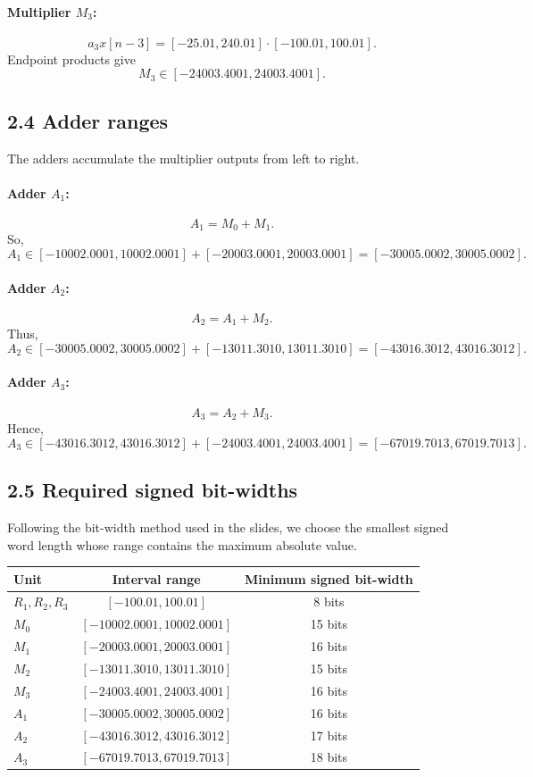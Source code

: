 \documentclass[11pt,a4paper]{article}
\begin{document}
\paragraph{Multiplier $M_3$:}
\[
a_3x[n-3]=[-25.01,240.01]\cdot[-100.01,100.01].
\]
Endpoint products give
\[
M_3\in[-24003.4001,24003.4001].
\]

\subsection*{2.4 Adder ranges}
The adders accumulate the multiplier outputs from left to right.

\paragraph{Adder $A_1$:}
\[
A_1=M_0+M_1.
\]
So,
\[
A_1\in[-10002.0001,10002.0001]+[-20003.0001,20003.0001]
=[-30005.0002,30005.0002].
\]

\paragraph{Adder $A_2$:}
\[
A_2=A_1+M_2.
\]
Thus,
\[
A_2\in[-30005.0002,30005.0002]+[-13011.3010,13011.3010]
=[-43016.3012,43016.3012].
\]

\paragraph{Adder $A_3$:}
\[
A_3=A_2+M_3.
\]
Hence,
\[
A_3\in[-43016.3012,43016.3012]+[-24003.4001,24003.4001]
=[-67019.7013,67019.7013].
\]

\subsection*{2.5 Required signed bit-widths}
Following the bit-width method used in the slides, we choose the smallest signed word length whose range contains the maximum absolute value.

\begin{center}
\begin{tabular}{lcc}
\toprule
Unit & Interval range & Minimum signed bit-width \\
\midrule
$R_1,R_2,R_3$ & $[-100.01,100.01]$ & 8 bits \\
$M_0$ & $[-10002.0001,10002.0001]$ & 15 bits \\
$M_1$ & $[-20003.0001,20003.0001]$ & 16 bits \\
$M_2$ & $[-13011.3010,13011.3010]$ & 15 bits \\
$M_3$ & $[-24003.4001,24003.4001]$ & 16 bits \\
$A_1$ & $[-30005.0002,30005.0002]$ & 16 bits \\
$A_2$ & $[-43016.3012,43016.3012]$ & 17 bits \\
$A_3$ & $[-67019.7013,67019.7013]$ & 18 bits \\
\bottomrule
\end{tabular}
\end{center}
\end{document}
